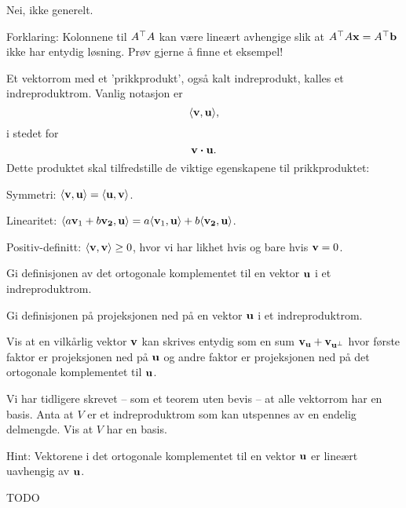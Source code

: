\begin{losning}
Nei, ikke generelt.

\noindent
Forklaring: Kolonnene til $A^\top A$ kan være lineært avhengige slik at $A^\top A \mathbf{x}=A^\top \mathbf{b}$ ikke har entydig løsning. Prøv gjerne å finne et eksempel!
\end{losning}



\begin{oppgave}
Et vektorrom med et 'prikkprodukt', også kalt indreprodukt, kalles et indreproduktrom. Vanlig notasjon er $$\langle \mathbf{v},\mathbf{u} \rangle,$$ i stedet for $$\mathbf{v}\boldsymbol{\cdot}\mathbf{u}.$$ Dette produktet skal tilfredstille de viktige egenskapene til prikkproduktet:

\noindent
Symmetri: $\langle \mathbf{v}, \mathbf{u}\rangle =\langle \mathbf{u}, \mathbf{v}\rangle$.

\noindent
Linearitet: $\langle a\mathbf{v}_1+b\mathbf{v_2}, \mathbf{u}\rangle =a\langle \mathbf{v}_1, \mathbf{u}\rangle+b\langle \mathbf{v_2}, \mathbf{u}\rangle$.

\noindent
Positiv-definitt: $\langle \mathbf{v}, \mathbf{v}\rangle \geq 0$, hvor vi har likhet hvis og bare hvis $\mathbf{v}=0$.

\begin{punkt}
Gi definisjonen av det ortogonale komplementet til en vektor $\mathbf{u}$ i et indreproduktrom.
\end{punkt}

\begin{punkt}
Gi definisjonen på projeksjonen ned på en vektor $\mathbf{u}$ i et indreproduktrom.
\end{punkt}

\begin{punkt}
Vis at en vilkårlig vektor $\mathbf{v}$ kan skrives entydig som en sum $\mathbf{v}_{\mathbf{u}}+\mathbf{v}_{\mathbf{u}^{\perp}}$ hvor første faktor er projeksjonen ned på $\mathbf{u}$ og andre faktor er projeksjonen ned på det ortogonale komplementet til $\mathbf{u}$.
\end{punkt}

\begin{punkt}
Vi har tidligere skrevet -- som et teorem uten bevis -- at alle vektorrom har en basis. Anta at $V$ er et indreproduktrom som kan utspennes av en endelig delmengde. Vis at $V$ har en basis.

\noindent
Hint: Vektorene i det ortogonale komplementet til en vektor $\mathbf{u}$ er lineært uavhengig av $\mathbf{u}$.
\end{punkt}


\end{oppgave}

\begin{losning}
TODO
\end{losning}

